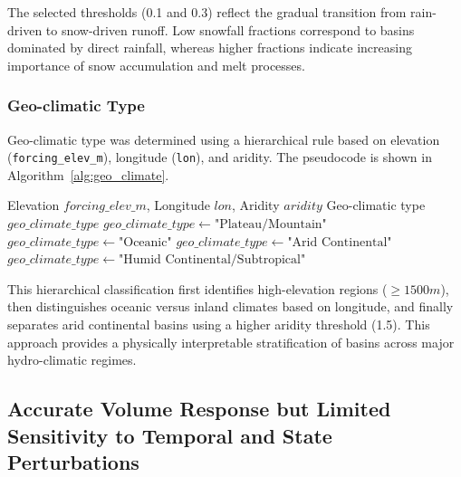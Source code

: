 \documentclass[11pt]{article}
\begin{document}
The selected thresholds (0.1 and 0.3) reflect the gradual transition from rain-driven to snow-driven runoff. Low snowfall fractions correspond to basins dominated by direct rainfall, whereas higher fractions indicate increasing importance of snow accumulation and melt processes\cite{Biemans2019}.

\subsubsection*{Geo-climatic Type}

Geo-climatic type was determined using a hierarchical rule based on elevation (\texttt{forcing\_elev\_m}), longitude (\texttt{lon}), and aridity\cite{hess-24-1081-2020}. The pseudocode is shown in Algorithm~\ref{alg:geo_climate}.

\begin{algorithm}[htbp]
    \caption{Hierarchical classification for geo-climatic type}
    \label{alg:geo_climate}
    \begin{algorithmic}[1]
        \Require Elevation $forcing\_elev\_m$, Longitude $lon$, Aridity $aridity$
        \Ensure Geo-climatic type $geo\_climate\_type$
        \State $geo\_climate\_type \gets \text{"Plateau/Mountain"}$
        \State $geo\_climate\_type \gets \text{"Oceanic"}$
        \State $geo\_climate\_type \gets \text{"Arid Continental"}$
        \Else
        \State $geo\_climate\_type \gets \text{"Humid Continental/Subtropical"}$
        \EndIf
    \end{algorithmic}
\end{algorithm}

This hierarchical classification first identifies high-elevation regions ($\geq 1500 m$), then distinguishes oceanic versus inland climates based on longitude, and finally separates arid continental basins using a higher aridity threshold (1.5). This approach provides a physically interpretable stratification of basins across major hydro-climatic regimes.

\subsection{Accurate Volume Response but Limited Sensitivity to Temporal and State Perturbations}
\label{sec:sensitive}
\end{document}
